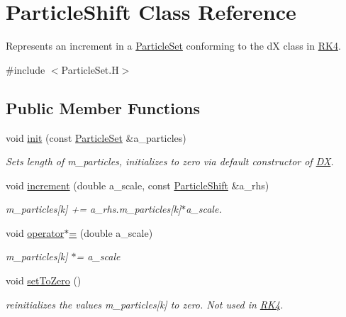 \hypertarget{class_particle_shift}{}\section{Particle\+Shift Class Reference}
\label{class_particle_shift}


Represents an increment in a \hyperlink{class_particle_set}{Particle\+Set} conforming to the dX class in \hyperlink{class_r_k4}{R\+K4}.  




{\ttfamily \#include $<$Particle\+Set.\+H$>$}

\subsection*{Public Member Functions}
\begin{DoxyCompactItemize}
\item 
\mbox{\label{class_particle_shift_aa298bec75ebcd7a6d39285dcc734927c}} 
void \hyperlink{class_particle_shift_aa298bec75ebcd7a6d39285dcc734927c}{init} (const \hyperlink{class_particle_set}{Particle\+Set} \&a\+\_\+particles)
\begin{DoxyCompactList}\small\item\em Sets length of m\+\_\+particles, initializes to zero via default constructor of \hyperlink{class_d_x}{DX}. \end{DoxyCompactList}\item 
\mbox{\label{class_particle_shift_a6f49ef57c1b4a140abacaca103572be3}} 
void \hyperlink{class_particle_shift_a6f49ef57c1b4a140abacaca103572be3}{increment} (double a\+\_\+scale, const \hyperlink{class_particle_shift}{Particle\+Shift} \&a\+\_\+rhs)
\begin{DoxyCompactList}\small\item\em m\+\_\+particles\mbox{[}k\mbox{]} += a\+\_\+rhs.\+m\+\_\+particles\mbox{[}k\mbox{]}$\ast$a\+\_\+scale. \end{DoxyCompactList}\item 
\mbox{\label{class_particle_shift_a8ffb0054d1822d05793b68c5e874f3a0}} 
void \hyperlink{class_particle_shift_a8ffb0054d1822d05793b68c5e874f3a0}{operator$\ast$=} (double a\+\_\+scale)
\begin{DoxyCompactList}\small\item\em m\+\_\+particles\mbox{[}k\mbox{]} $\ast$= a\+\_\+scale \end{DoxyCompactList}\item 
\mbox{\label{class_particle_shift_a4931a6bc6358b26d5e5e48029540c6c5}} 
void \hyperlink{class_particle_shift_a4931a6bc6358b26d5e5e48029540c6c5}{set\+To\+Zero} ()
\begin{DoxyCompactList}\small\item\em reinitializes the values m\+\_\+particles\mbox{[}k\mbox{]} to zero. Not used in \hyperlink{class_r_k4}{R\+K4}. \end{DoxyCompactList}\end{DoxyCompactItemize}
